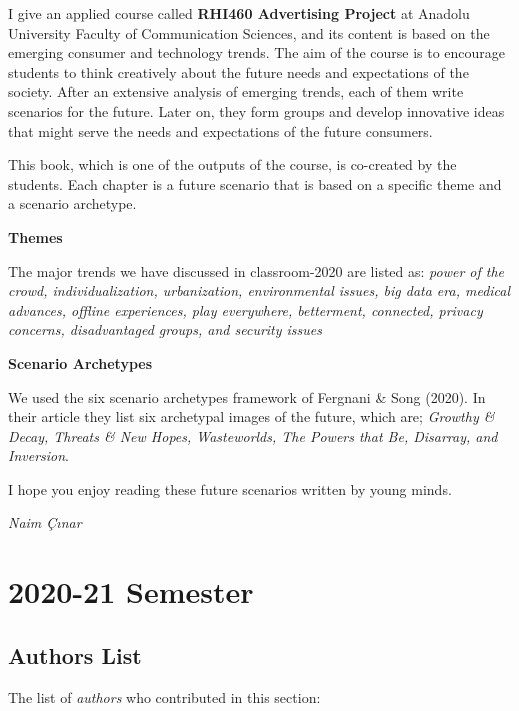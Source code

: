 \documentclass[]{book}
\begin{document}
I give an applied course called \textbf{RHI460 Advertising Project} at Anadolu University Faculty of Communication Sciences, and its content is based on the emerging consumer and technology trends. The aim of the course is to encourage students to think creatively about the future needs and expectations of the society. After an extensive analysis of emerging trends, each of them write scenarios for the future. Later on, they form groups and develop innovative ideas that might serve the needs and expectations of the future consumers.

This book, which is one of the outputs of the course, is co-created by the students. Each chapter is a future scenario that is based on a specific theme and a scenario archetype.

\textbf{Themes}

The major trends we have discussed in classroom-2020 are listed as: \emph{power of the crowd, individualization, urbanization, environmental issues, big data era, medical advances, offline experiences, play everywhere, betterment, connected, privacy concerns, disadvantaged groups, and security issues}

\textbf{Scenario Archetypes}

We used the six scenario archetypes framework of Fergnani \& Song (2020). In their article they list six archetypal images of the future, which are; \emph{Growthy \& Decay, Threats \& New Hopes, Wasteworlds, The Powers that Be, Disarray, and Inversion}.

I hope you enjoy reading these future scenarios written by young minds.

\emph{Naim Çınar}

\hypertarget{part-2020-21-semester}{%
\part*{2020-21 Semester}\label{part-2020-21-semester}}

\hypertarget{section-id}{%
\chapter*{Authors List}\label{section-id}}

The list of \emph{authors} who contributed in this section:
\end{document}
